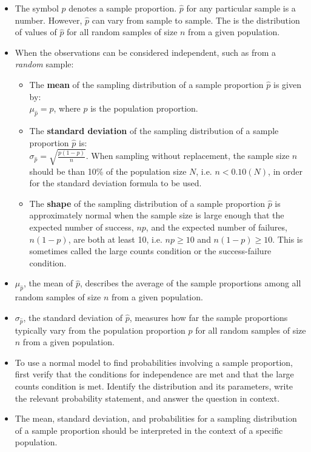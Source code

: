 \begin{itemize} 


\item The symbol $\hat{p}$ denotes a sample proportion.  $\hat{p}$ for any particular sample is a number.  However, $\hat{p}$ can vary from sample to sample.  The  is the distribution of values of $\hat{p}$ for all random samples of size $n$ from a given population.  

\item When the observations can be considered independent, such as from a \emph{random} sample:
\begin{itemize}
\item The \textbf{mean} of the sampling distribution of a sample proportion $\hat{p}$ is given by:  \\
$\mu_{\hat{p}}=p$, where $p$ is the population proportion.  

\item The \textbf{standard deviation} of the sampling distribution of a sample proportion $\hat{p}$ is: \\
$\sigma_{\hat{p}} = \sqrt{\frac{p(1-p)}{n}}$.  When sampling without replacement, the sample size $n$ should be than 10\% of the population size $N$, i.e. $n<0.10(N)$, in order for the standard deviation formula to be used.  

\item The \textbf{shape} of the sampling distribution of a sample proportion $\hat{p}$ is approximately normal when the sample size is large enough that the expected number of success, $np$, and the expected number of failures, $n(1-p)$, are both at least 10, i.e.  $np\ge 10$ and $n(1-p)\ge 10$.  This is sometimes called the large counts condition or the success-failure condition.
\end{itemize}

\item $\mu_{\hat{p}}$, the mean of $\hat{p}$, describes the average of the sample proportions among all random samples of size $n$ from a given population.  

\item $\sigma_{\hat{p}}$, the standard deviation of $\hat{p}$, measures how far the sample proportions typically vary from the population proportion $p$ for all random samples of size $n$ from a given population.  

\item To use a normal model to find probabilities involving a sample proportion, first verify that the conditions for independence are met and that the large counts condition is met.   Identify the distribution and its parameters, write the relevant probability statement, and answer the question in context.

\item The mean, standard deviation, and probabilities for a sampling distribution
of a sample proportion should be interpreted in the context of a specific population.


\end{itemize}

